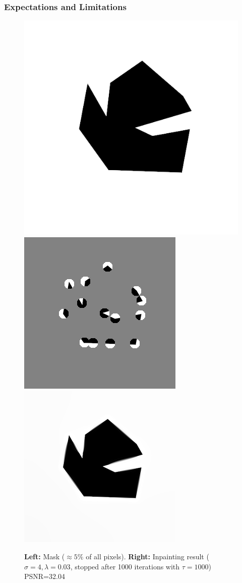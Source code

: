 \documentclass{beamer}
\begin{document}
    \begin{frame}[t]
        \frametitle{Expectations and Limitations}
        \begin{figure}
             \centering
             \includegraphics[width=0.3\linewidth]{../images/binary/abstract1.png}
             \includegraphics[width=0.3\linewidth]{../thesis/Images/abstract1_small-mask.png}
             \includegraphics[width=0.3\linewidth]{../thesis/Images/abstract_small_inpaint.png}
             \caption{\textbf{Left:} Mask ($\approx5\%$ of all pixels). \textbf{Right:} Inpainting result
             ($\sigma=4,\lambda=0.03$, stopped after 1000 iterations with $\tau=1000$) PSNR=32.04}
         \end{figure} 
    \end{frame}
\end{document}
